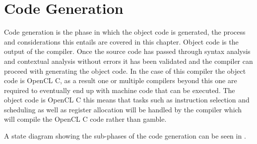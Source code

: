 \chapter{Code Generation}
Code generation is the phase in which the object code is generated, the process and considerations this entails are covered in this chapter.
Object code is the output of the compiler.
Once the source code has passed through syntax analysis and contextual analysis without errors it has been validated and the compiler can proceed with generating the object code.
In the case of this compiler the object code is OpenCL C, as a result one or multiple compilers beyond this one are required to eventually end up with machine code that can be executed.
The object code is OpenCL C this means that tasks such as instruction selection and scheduling as well as register allocation will be handled by the compiler which will compile the OpenCL C code rather than \gls{gamble}.

A state diagram showing the sub-phases of the code generation can be seen in .



